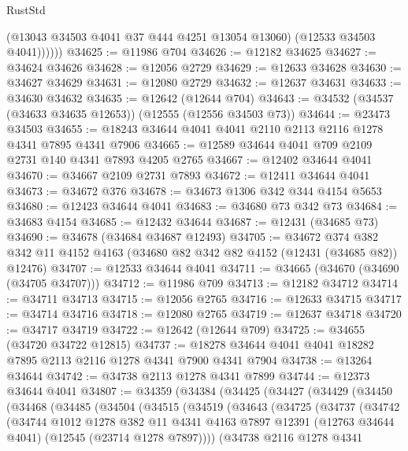 \begin{lexlean}{RustStd}
\begin{coremodule}
              (@13043 @34503 @4041 @37 @444 @4251 @13054 @13060)
              (@12533 @34503 @4041))))))
@34625 := @11986 @704
@34626 := @12182 @34625
@34627 := @34624 @34626
@34628 := @12056 @2729
@34629 := @12633 @34628
@34630 := @34627 @34629
@34631 := @12080 @2729
@34632 := @12637 @34631
@34633 := @34630 @34632
@34635 := @12642 (@12644 @704)
@34643 := @34532 (@34537 (@34633 @34635 @12653)) (@12555 (@12556 @34503 @73))
@34644 := @23473 @34503
@34655 := @18243 @34644 @4041 @4041 @2110 @2113 @2116 @1278 @4341 @7895 @4341 @7906
@34665 := @12589 @34644 @4041 @709 @2109 @2731 @140 @4341 @7893 @4205 @2765
@34667 := @12402 @34644 @4041
@34670 := @34667 @2109 @2731 @7893
@34672 := @12411 @34644 @4041
@34673 := @34672 @376
@34678 := @34673 @1306 @342 @344 @4154 @5653
@34680 := @12423 @34644 @4041
@34683 := @34680 @73 @342 @73
@34684 := @34683 @4154
@34685 := @12432 @34644
@34687 := @12431 (@34685 @73)
@34690 := @34678 (@34684 @34687 @12493)
@34705 := @34672
    @374
    @382
    @342
    @11
    @4152
    @4163
    (@34680 @82 @342 @82 @4152 (@12431 (@34685 @82)) @12476)
@34707 := @12533 @34644 @4041
@34711 := @34665 (@34670 (@34690 (@34705 @34707)))
@34712 := @11986 @709
@34713 := @12182 @34712
@34714 := @34711 @34713
@34715 := @12056 @2765
@34716 := @12633 @34715
@34717 := @34714 @34716
@34718 := @12080 @2765
@34719 := @12637 @34718
@34720 := @34717 @34719
@34722 := @12642 (@12644 @709)
@34725 := @34655 (@34720 @34722 @12815)
@34737 := @18278 @34644 @4041 @4041 @18282 @7895 @2113 @2116 @1278 @4341 @7900 @4341 @7904
@34738 := @13264 @34644
@34742 := @34738 @2113 @1278 @4341 @7899
@34744 := @12373 @34644 @4041
@34807 := @34359
    (@34384
      (@34425
        (@34427
          (@34429
            (@34450
              (@34468
                (@34485
                  (@34504
                    (@34515
                      (@34519
                        (@34643
                          (@34725
                            (@34737
                              (@34742
                                (@34744
                                  @1012
                                  @1278
                                  @382
                                  @11
                                  @4341
                                  @4163
                                  @7897
                                  @12391
                                  (@12763 @34644 @4041)
                                  (@12545 (@23714 @1278 @7897))))
                              (@34738
                                @2116
                                @1278
                                @4341

\end{coremodule}
\end{lexlean}
